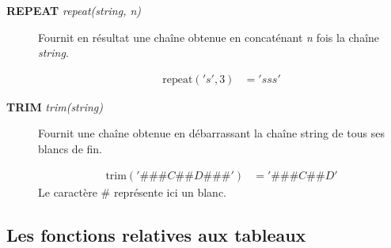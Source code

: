 \documentclass[a4paper,twoside]{article}
\begin{document}
\begin{description}
\item[\textbf{REPEAT} \emph{repeat(string, n)}] Fournit en résultat une chaîne obtenue en concaténant \emph{n} fois la chaîne \emph{string}. 
\begin{exemple}
\begin{align}
\mathrm{repeat}('s',3)  &= 'sss'
\end{align}
\end{exemple}


\item[\textbf{TRIM} \emph{trim(string)}] Fournit une chaîne obtenue en débarrassant la chaîne string de tous ses blancs de fin.  
\begin{exemple}
\begin{align}
\mathrm{trim}('\#\#\#C\#\#D\#\#\#')  &= '\#\#\#C\#\#D'
\end{align}
Le 
caractère \# représente ici un blanc.  
\end{exemple} 


\end{description}

\subsection{Les fonctions relatives aux tableaux}
\end{document}
